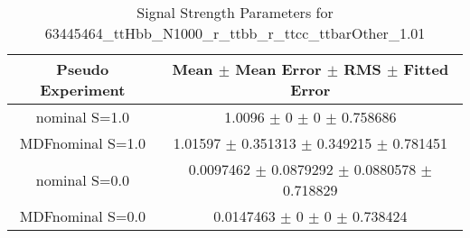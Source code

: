 \begin{table}
\centering
\caption{Signal Strength Parameters for 63445464\_ttHbb\_N1000\_r\_ttbb\_r\_ttcc\_ttbarOther\_1.01}
\begin{tabular}{cc}
\toprule
Pseudo Experiment & Mean $\pm$ Mean Error $\pm$ RMS $\pm$ Fitted Error\\
\midrule
nominal S=1.0 & \num{1.0096} $\pm$ \num{0} $\pm$ \num{0} $\pm$ \num{0.758686}\\
MDFnominal S=1.0 & \num{1.01597} $\pm$ \num{0.351313} $\pm$ \num{0.349215} $\pm$ \num{0.781451}\\
nominal S=0.0 & \num{0.0097462} $\pm$ \num{0.0879292} $\pm$ \num{0.0880578} $\pm$ \num{0.718829}\\
MDFnominal S=0.0 & \num{0.0147463} $\pm$ \num{0} $\pm$ \num{0} $\pm$ \num{0.738424}\\
\bottomrule
\end{tabular}
\end{table}